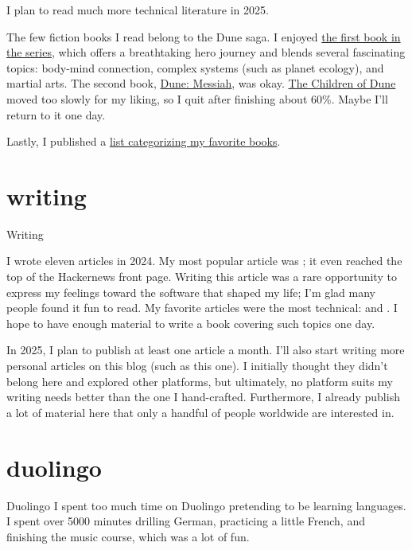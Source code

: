 \documentclass{article}
\begin{document}
I plan to read much more technical literature in 2025.

The few fiction books I read belong to the Dune saga.
I enjoyed \href{https://www.goodreads.com/book/show/44767458-dune}{the first book in the series}, which offers a breathtaking hero journey and blends several fascinating topics:
body-mind connection, complex systems (such as planet ecology), and martial arts.
The second book, \href{https://www.goodreads.com/book/show/44492285-dune-messiah}{Dune: Messiah}, was okay.
\href{https://www.goodreads.com/book/show/46037428-children-of-dune}{The Children of Dune} moved too slowly for my liking, so I quit after finishing about 60\%.
Maybe I'll return to it one day.

Lastly, I published a \href{https://github.com/roman-kashitsyn/my-favorite-things}{list categorizing my favorite books}.

\section{writing}{Writing}

I wrote eleven articles in 2024.
My most popular article was ; it even reached the top of the Hackernews front page.
Writing this article was a rare opportunity to express my feelings toward the software that shaped my life; I’m glad many people found it fun to read.
My favorite articles were the most technical:  and .
I hope to have enough material to write a book covering such topics one day.

In 2025, I plan to publish at least one article a month.
I'll also start writing more personal articles on this blog (such as this one).
I initially thought they didn't belong here and explored other platforms, but ultimately, no platform suits my writing needs better than the one I hand-crafted.
Furthermore, I already publish a lot of material here that only a handful of people worldwide are interested in.

\section{duolingo}{Duolingo}
I spent too much time on Duolingo pretending to be learning languages.
I spent over 5000 minutes drilling German, practicing a little French, and finishing the music course, which was a lot of fun.
\end{document}
